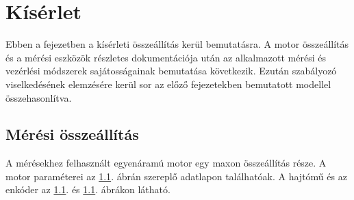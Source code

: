 \chapter{Kísérlet}\label{chap:experiment}

Ebben a fejezetben a kísérleti összeállítás kerül bemutatásra. A motor összeállítás és a mérési eszközök 
részletes dokumentációja után az alkalmazott mérési és vezérlési módszerek sajátosságainak bemutatása 
következik. Ezután szabályozó viselkedésének elemzésére kerül sor az előző fejezetekben bemutatott modellel 
összehasonlítva.

\section{Mérési összeállítás}
A mérésekhez felhasznált egyenáramú motor egy maxon összeállítás része. A motor paraméterei
az \ref{}. ábrán szereplő adatlapon találhatóak. A hajtómű és az enkóder az \ref{}. és \ref{}. ábrákon látható.

